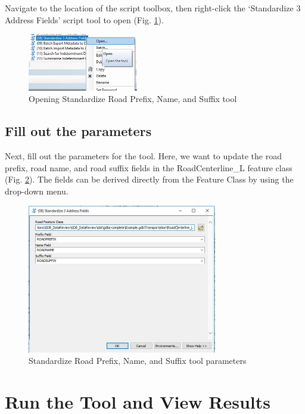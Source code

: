 \documentclass[openany]{book}
\theoremstyle{definition}
\theoremstyle{definition}
\theoremstyle{definition}
\theoremstyle{remark}
\begin{document}
Navigate to the location of the script toolbox, then right-click the
`Standardize 3 Address Fields' script tool to open (Fig.
\ref{fig:std3open}).

\begin{figure}[H]

{\centering \includegraphics[width=1.9in,]{figures/std3-open} 

}

\caption{Opening Standardize Road Prefix, Name, and Suffix tool}\label{fig:std3open}
\end{figure}

\subsection{Fill out the parameters}\label{fill-out-the-parameters-8}

Next, fill out the parameters for the tool. Here, we want to update the
road prefix, road name, and road suffix fields in the RoadCenterline\_L
feature class (Fig. \ref{fig:std3params}). The fields can be derived
directly from the Feature Class by using the drop-down menu.

\begin{figure}[H]

{\centering \includegraphics[width=3.26in,]{figures/std3-toolparams} 

}

\caption{Standardize Road Prefix, Name, and Suffix tool parameters}\label{fig:std3params}
\end{figure}

\section{Run the Tool and View
Results}\label{run-the-tool-and-view-results-8}
\end{document}

